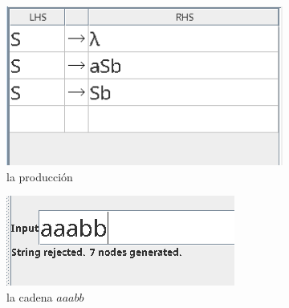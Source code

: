 \documentclass{article}
\begin{document}
\begin{flushleft}
\begin{enumerate}
                \begin{figure}[h] 
                    \centering
                    \begin{subfigure}[b]{0.45\textwidth}
                        \centering
                        \includegraphics[width=\textwidth]{./Imagenes/produccion1.png}
                        \caption{la producción}
                        \label{fig:label1}
                    \end{subfigure}
                    \hfill
                    \begin{subfigure}[b]{0.45\textwidth}
                        \centering
                        \includegraphics[width=\textwidth]{./Imagenes/grafoaaabb.png}
                        \caption{la cadena $aaabb$}
                        \label{fig:label2}
                    \end{subfigure}
                    \vspace{0.5cm} 
                    \\
                    \begin{subfigure}[b]{0.45\textwidth}
                        \centering

\end{subfigure}
\end{figure}
\end{enumerate}
\end{flushleft}
\end{document}
